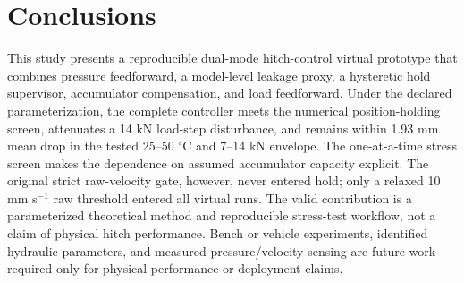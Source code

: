 \documentclass[agriengineering,article,submit,moreauthors]{Definitions/mdpi}
\begin{document}
\section{Conclusions}
This study presents a reproducible dual-mode hitch-control virtual prototype that combines pressure feedforward, a model-level leakage proxy, a hysteretic hold supervisor, accumulator compensation, and load feedforward. Under the declared parameterization, the complete controller meets the numerical position-holding screen, attenuates a 14 kN load-step disturbance, and remains within 1.93 mm mean drop in the tested 25--50 $^\circ$C and 7--14 kN envelope. The one-at-a-time stress screen makes the dependence on assumed accumulator capacity explicit. The original strict raw-velocity gate, however, never entered hold; only a relaxed 10 mm s$^{-1}$ raw threshold entered all virtual runs. The valid contribution is a parameterized theoretical method and reproducible stress-test workflow, not a claim of physical hitch performance. Bench or vehicle experiments, identified hydraulic parameters, and measured pressure/velocity sensing are future work required only for physical-performance or deployment claims.

\end{document}
